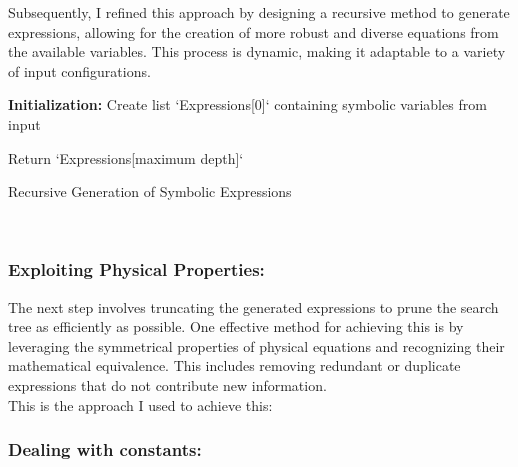 \documentclass{article}
\begin{document}
Subsequently, I refined this approach by designing a recursive method to generate expressions, allowing for the creation of more robust and diverse equations from the available variables. This process is dynamic, making it adaptable to a variety of input configurations.\\




\begin{algorithm}[H]
\SetAlgoLined
{}

\textbf{Initialization:}\;
Create list `Expressions[0]` containing symbolic variables from input\;


Return `Expressions[maximum depth]`\;

\caption{Recursive Generation of Symbolic Expressions}
\label{alg:recursive_expressions} %
\end{algorithm}\\


\subsubsection{ Exploiting Physical Properties: }

The next step involves truncating the generated expressions to prune the search tree as efficiently as possible. One effective method for achieving this is by leveraging the symmetrical properties of physical equations and recognizing their mathematical equivalence. This includes removing redundant or duplicate expressions that do not contribute new information.\\

This is the approach I used to achieve this:\\


\subsubsection{Dealing with constants:}
\end{document}
